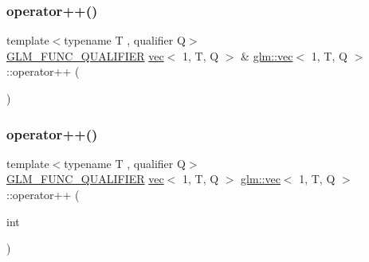 \mbox{\label{structglm_1_1vec_3_011_00_01_t_00_01_q_01_4_a987d92f70c9541002ae2b696f06947f0}} 
\subsubsection{\texorpdfstring{operator++()}{operator++()}\hspace{0.1cm}{\footnotesize\ttfamily [1/2]}}
{\footnotesize\ttfamily template$<$typename T , qualifier Q$>$ \\
\hyperlink{setup_8hpp_a33fdea6f91c5f834105f7415e2a64407}{G\+L\+M\+\_\+\+F\+U\+N\+C\+\_\+\+Q\+U\+A\+L\+I\+F\+I\+ER} \hyperlink{structglm_1_1vec}{vec}$<$ 1, T, Q $>$ \& \hyperlink{structglm_1_1vec}{glm\+::vec}$<$ 1, T, Q $>$\+::operator++ (\begin{DoxyParamCaption}{ }\end{DoxyParamCaption})}

\mbox{\label{structglm_1_1vec_3_011_00_01_t_00_01_q_01_4_aa829fdf00e136856718ce8c37b43d507}} 
\subsubsection{\texorpdfstring{operator++()}{operator++()}\hspace{0.1cm}{\footnotesize\ttfamily [2/2]}}
{\footnotesize\ttfamily template$<$typename T , qualifier Q$>$ \\
\hyperlink{setup_8hpp_a33fdea6f91c5f834105f7415e2a64407}{G\+L\+M\+\_\+\+F\+U\+N\+C\+\_\+\+Q\+U\+A\+L\+I\+F\+I\+ER} \hyperlink{structglm_1_1vec}{vec}$<$ 1, T, Q $>$ \hyperlink{structglm_1_1vec}{glm\+::vec}$<$ 1, T, Q $>$\+::operator++ (\begin{DoxyParamCaption}\item[{int}]{ }\end{DoxyParamCaption})}

\mbox{\label{structglm_1_1vec_3_011_00_01_t_00_01_q_01_4_aefbc9c1c018abcb5c7e6ebe8c1d1fc1f}} 
